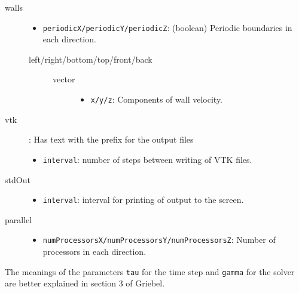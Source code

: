 \documentclass[pdftex,A4]{article}
\begin{document}
\begin{description}
\begin{description}
    \item [walls] \hfill

        \begin{itemize}
            \item {\tt periodicX/periodicY/periodicZ}: (boolean) Periodic boundaries in each direction.
        \end{itemize}

        \begin{description}
            \item [left/right/bottom/top/front/back] \hfill
            \begin{description}
                \item [vector] \hfill
                \begin{itemize}
                    \item {\tt x/y/z}: Components of wall velocity.
                \end{itemize}
            \end{description}
        \end{description}

    \item [vtk]: Has text with the prefix for the output files \hfill
        \begin{itemize}
            \item {\tt interval}: number of steps between writing of VTK files.
        \end{itemize}

    \item [stdOut] \hfill
        \begin{itemize}
            \item {\tt interval}: interval for printing of output to the screen.
        \end{itemize}

    \item [parallel] \hfill
        \begin{itemize}
            \item {\tt numProcessorsX/numProcessorsY/numProcessorsZ}: Number of processors in each direction.
        \end{itemize}

    \end{description}
\end{description}

The meanings of the parameters {\tt tau} for the time step and {\tt gamma} for the solver are better explained in section 3 of Griebel.
\end{document}
